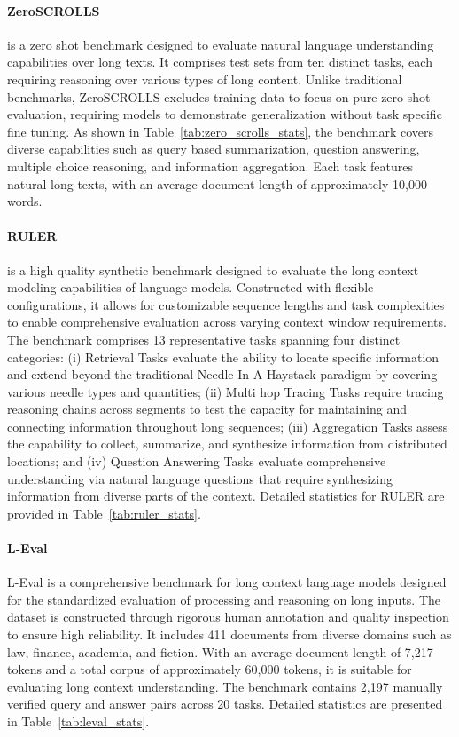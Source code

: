 \documentclass[11pt]{article}
\begin{document}
\paragraph{ZeroSCROLLS} \cite{shaham2023zeroscrolls} is a zero shot benchmark designed to evaluate natural language understanding capabilities over long texts. It comprises test sets from ten distinct tasks, each requiring reasoning over various types of long content. Unlike traditional benchmarks, ZeroSCROLLS excludes training data to focus on pure zero shot evaluation, requiring models to demonstrate generalization without task specific fine tuning. As shown in Table~\ref{tab:zero_scrolls_stats}, the benchmark covers diverse capabilities such as query based summarization, question answering, multiple choice reasoning, and information aggregation. Each task features natural long texts, with an average document length of approximately 10,000 words.

\paragraph{RULER} \cite{hsieh2024ruler} is a high quality synthetic benchmark designed to evaluate the long context modeling capabilities of language models. Constructed with flexible configurations, it allows for customizable sequence lengths and task complexities to enable comprehensive evaluation across varying context window requirements. The benchmark comprises 13 representative tasks spanning four distinct categories: (i) Retrieval Tasks evaluate the ability to locate specific information and extend beyond the traditional Needle In A Haystack paradigm by covering various needle types and quantities; (ii) Multi hop Tracing Tasks require tracing reasoning chains across segments to test the capacity for maintaining and connecting information throughout long sequences; (iii) Aggregation Tasks assess the capability to collect, summarize, and synthesize information from distributed locations; and (iv) Question Answering Tasks evaluate comprehensive understanding via natural language questions that require synthesizing information from diverse parts of the context. Detailed statistics for RULER are provided in Table~\ref{tab:ruler_stats}.

\paragraph{L-Eval} \cite{an2024eval} L-Eval is a comprehensive benchmark for long context language models designed for the standardized evaluation of processing and reasoning on long inputs. The dataset is constructed through rigorous human annotation and quality inspection to ensure high reliability. It includes 411 documents from diverse domains such as law, finance, academia, and fiction. With an average document length of 7,217 tokens and a total corpus of approximately 60,000 tokens, it is suitable for evaluating long context understanding. The benchmark contains 2,197 manually verified query and answer pairs across 20 tasks. Detailed statistics are presented in Table~\ref{tab:leval_stats}.
\end{document}
